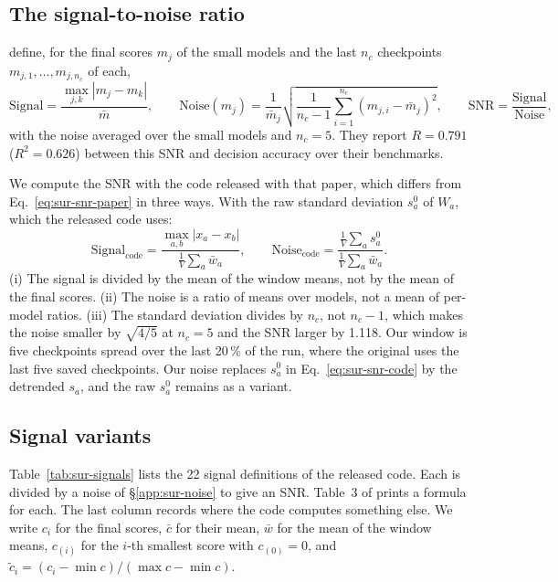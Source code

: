 \subsection{The signal-to-noise ratio}
\label{app:sur-snr}

\citet{heineman_signal_2025} define, for the final scores $m_j$ of the small models and the last $n_c$ checkpoints $m_{j,1},\dots,m_{j,n_c}$ of each,
\begin{equation}
\text{Signal} = \frac{\max_{j,k} |m_j - m_k|}{\bar{m}}, \qquad
\text{Noise}(m_j) = \frac{1}{\bar{m}_j}\sqrt{\frac{1}{n_c - 1}\sum_{i=1}^{n_c}(m_{j,i} - \bar{m}_j)^2}, \qquad
\mathrm{SNR} = \frac{\text{Signal}}{\text{Noise}},
\label{eq:sur-snr-paper}
\end{equation}
with the noise averaged over the small models and $n_c = 5$.
They report $R = 0.791$ ($R^2 = 0.626$) between this SNR and decision accuracy over their benchmarks.

We compute the SNR with the code released with that paper, which differs from Eq.~\ref{eq:sur-snr-paper} in three ways.
With the raw standard deviation $s^{0}_a$ of $W_a$, which the released code uses:
\begin{equation}
\text{Signal}_{\text{code}} = \frac{\max_{a,b} |x_a - x_b|}{\frac{1}{V}\sum_a \bar{w}_a}, \qquad
\text{Noise}_{\text{code}} = \frac{\frac{1}{V}\sum_a s^{0}_a}{\frac{1}{V}\sum_a \bar{w}_a}.
\label{eq:sur-snr-code}
\end{equation}
(i) The signal is divided by the mean of the window means, not by the mean of the final scores.
(ii) The noise is a ratio of means over models, not a mean of per-model ratios.
(iii) The standard deviation divides by $n_c$, not $n_c - 1$, which makes the noise smaller by $\sqrt{4/5}$ at $n_c = 5$ and the SNR larger by 1.118.
Our window is five checkpoints spread over the last 20\,\% of the run, where the original uses the last five saved checkpoints. Our noise replaces $s^{0}_a$ in Eq.~\ref{eq:sur-snr-code} by the detrended $s_a$, and the raw $s^{0}_a$ remains as a variant.

\subsection{Signal variants}
\label{app:sur-signals}

Table~\ref{tab:sur-signals} lists the 22 signal definitions of the released code.
Each is divided by a noise of \S\ref{app:sur-noise} to give an SNR.
Table~3 of \citet{heineman_signal_2025} prints a formula for each. The last column records where the code computes something else.
We write $c_i$ for the final scores, $\bar{c}$ for their mean, $\bar{w}$ for the mean of the window means, $c_{(i)}$ for the $i$-th smallest score with $c_{(0)} = 0$, and $\tilde{c}_i = (c_i - \min c)/(\max c - \min c)$.

